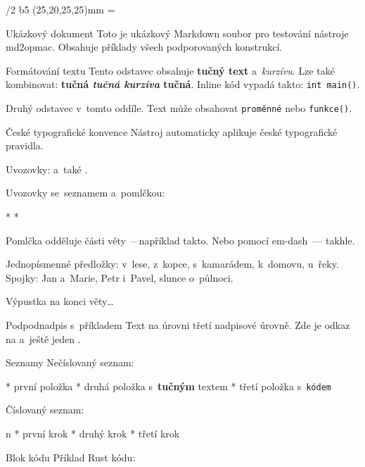 \fontfam[LM]
\def\begcitation{\par\medskip\leftskip=2em\rightskip=2em\noindent}
\def\endcitation{\par\leftskip=0em\rightskip=0em\medskip}
\fontfam[Pagella]
\typosize[11/13.5]
\margins/2 b5 (25,20,25,25)mm
\footline={\hss\folio\hss}



\chap Ukázkový dokument
Toto je ukázkový Markdown soubor pro testování nástroje md2opmac.
Obsahuje příklady všech podporovaných konstrukcí.


\sec Formátování textu
Tento odstavec obsahuje {\bf tučný text} a~{\it kurzívu}. Lze také kombinovat:
{\bf tučná {\it tučná kurzíva} tučná}. Inline kód vypadá takto: {\tt int main()}.

Druhý odstavec v~tomto oddíle. Text může obsahovat {\tt proměnné} nebo {\tt funkce()}.


\sec České typografické konvence
Nástroj automaticky aplikuje české typografické pravidla.

Uvozovky:  a~také .

Uvozovky se~seznamem a~pomlčkou:

\begitems
* 
* 
\enditems

Pomlčka odděluje části věty~-- například takto. Nebo pomocí em-dash~--- takhle.

Jednopísmenné předložky: v~lese, z~kopce, s~kamarádem, k~domovu, u~řeky.
Spojky: Jan a~Marie, Petr i~Pavel, slunce o~půlnoci.

Výpustka na konci věty\dots{}


\secc Podpodnadpis s~příkladem
Text na úrovni třetí nadpisové úrovně. Zde je odkaz na
 a~ještě jeden
.


\sec Seznamy
Nečíslovaný seznam:

\begitems
* první položka
* druhá položka s~{\bf tučným} textem
* třetí položka s~{\tt kódem}
\enditems

Číslovaný seznam:

\begitems \style n
* první krok
* druhý krok
* třetí krok
\enditems


\sec Blok kódu
Příklad Rust kódu:

